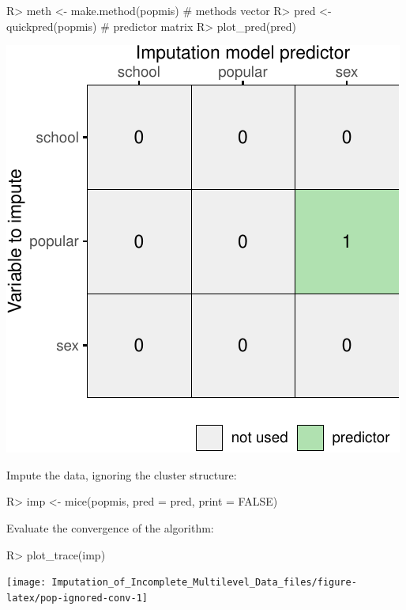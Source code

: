 \documentclass[
]{jss}
\begin{document}
\begin{CodeChunk}
\begin{CodeInput}
R> meth <- make.method(popmis) # methods vector
R> pred <- quickpred(popmis)   # predictor matrix
R> plot_pred(pred)
\end{CodeInput}


\begin{center}\includegraphics{Imputation_of_Incomplete_Multilevel_Data_files/figure-latex/pop-ignored-pred-1} \end{center}

\end{CodeChunk}

Impute the data, ignoring the cluster structure:

\begin{CodeChunk}
\begin{CodeInput}
R> imp <- mice(popmis, pred = pred, print = FALSE)
\end{CodeInput}
\end{CodeChunk}

Evaluate the convergence of the algorithm:

\begin{CodeChunk}
\begin{CodeInput}
R> plot_trace(imp)
\end{CodeInput}


\begin{center}\texttt{[image: Imputation\_of\_Incomplete\_Multilevel\_Data\_files/figure-latex/pop-ignored-conv-1]} \end{center}

\end{CodeChunk}
\end{document}
